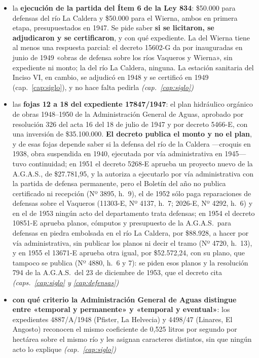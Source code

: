 \begin{itemize}[leftmargin=*]
\item la \textbf{ejecución de la partida del Ítem 6 de la Ley 834}: \$50.000 para defensas del río La Caldera y \$50.000 para el Wierna, ambos en primera etapa, presupuestados en 1947. Se pide saber \textbf{si se licitaron, se adjudicaron y se certificaron}, y con qué expediente. La del Wierna tiene al menos una respuesta parcial: el decreto 15602-G da por inauguradas en junio de 1949 «obras de defensa sobre los ríos Vaqueros y Wierna», sin expediente ni monto; la del río La Caldera, ninguna. La estación sanitaria del Inciso VI, en cambio, se adjudicó en 1948 y se certificó en 1949 (cap.\ \ref{cap:siglo}), y no hace falta pedirla \textit{(cap.\ \ref{cap:siglo})}
\item las \textbf{fojas 12 a 18 del expediente 17847/1947}: el plan hidráulico orgánico de obras 1948--1950 de la Administración General de Aguas, aprobado por resolución 326 del acta 16 del 18 de julio de 1947 y por decreto 5466-E, con una inversión de \$35.100.000. \textbf{El decreto publica el monto y no el plan}, y de esas fojas depende saber si la defensa del río de la Caldera ---croquis en 1938, obra suspendida en 1940, ejecutada por vía administrativa en 1945--- tuvo continuidad; en 1951 el decreto 5268-E aprueba un proyecto nuevo de la A.G.A.S., de \$27.781,95, y la autoriza a ejecutarlo por vía administrativa con la partida de defensa permanente, pero el Boletín del año no publica certificado ni recepción (Nº 3895, h.\ 9), el de 1952 sólo paga reparaciones de defensas sobre el Vaqueros (11303-E, Nº 4137, h.\ 7; 2026-E, Nº 4292, h.\ 6) y en el de 1953 ningún acto del departamento trata defensas; en 1954 el decreto 10851-E aprueba planos, cómputos y presupuesto de la A.G.A.S.\ para defensas en piedra embolsada en el río La Caldera, por \$88.928, a hacer por vía administrativa, sin publicar los planos ni decir el tramo (Nº 4720, h.\ 13), y en 1955 el 13671-E aprueba otra igual, por \$52.572,24, con su plano, que tampoco se publica (Nº 4880, h.\ 6 y 7): se piden esos planos y la resolución 794 de la A.G.A.S.\ del 23 de diciembre de 1953, que el decreto cita \textit{(caps.\ \ref{cap:siglo} y \ref{cap:defensas})}
\item \textbf{con qué criterio la Administración General de Aguas distingue entre «temporal y permanente» y «temporal y eventual»}: los expedientes 4887/A/1948 (Pfister, La Helvecia) y 4498/47 (Linares, El Angosto) reconocen el mismo coeficiente de 0,525 litros por segundo por hectárea sobre el mismo río y les asignan caracteres distintos, sin que ningún acto lo explique \textit{(cap.\ \ref{cap:siglo})}

\end{itemize}

